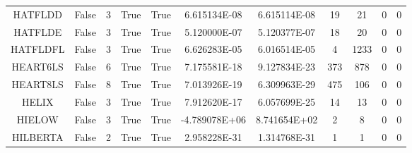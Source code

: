 \begin{longtable}{ccccccccccc}
	\cellcolor{default1} HATFLDD& \cellcolor{default1} False& \cellcolor{default1} 3& \cellcolor{default1} True& \cellcolor{default1} True& \cellcolor{ok} 6.615134E-08& \cellcolor{best} 6.615114E-08& \cellcolor{best} 19& \cellcolor{ok} 21& \cellcolor{default1} 0& \cellcolor{default1} 0\\
	\cellcolor{default2} HATFLDE& \cellcolor{default2} False& \cellcolor{default2} 3& \cellcolor{default2} True& \cellcolor{default2} True& \cellcolor{best} 5.120000E-07& \cellcolor{ok} 5.120377E-07& \cellcolor{best} 18& \cellcolor{ok} 20& \cellcolor{default2} 0& \cellcolor{default2} 0\\
	\cellcolor{default1} HATFLDFL& \cellcolor{default1} False& \cellcolor{default1} 3& \cellcolor{default1} True& \cellcolor{default1} True& \cellcolor{ok} 6.626283E-05& \cellcolor{best} 6.016514E-05& \cellcolor{best} 4& \cellcolor{poor} 1233& \cellcolor{default1} 0& \cellcolor{default1} 0\\
	\cellcolor{default2} HEART6LS& \cellcolor{default2} False& \cellcolor{default2} 6& \cellcolor{default2} True& \cellcolor{default2} True& \cellcolor{ok} 7.175581E-18& \cellcolor{best} 9.127834E-23& \cellcolor{best} 373& \cellcolor{poor} 878& \cellcolor{default2} 0& \cellcolor{default2} 0\\
	\cellcolor{default1} HEART8LS& \cellcolor{default1} False& \cellcolor{default1} 8& \cellcolor{default1} True& \cellcolor{default1} True& \cellcolor{ok} 7.013926E-19& \cellcolor{best} 6.309963E-29& \cellcolor{poor} 475& \cellcolor{best} 106& \cellcolor{default1} 0& \cellcolor{default1} 0\\
	\cellcolor{default2} HELIX& \cellcolor{default2} False& \cellcolor{default2} 3& \cellcolor{default2} True& \cellcolor{default2} True& \cellcolor{ok} 7.912620E-17& \cellcolor{best} 6.057699E-25& \cellcolor{ok} 14& \cellcolor{best} 13& \cellcolor{default2} 0& \cellcolor{default2} 0\\
	\cellcolor{default1} HIELOW& \cellcolor{default1} False& \cellcolor{default1} 3& \cellcolor{default1} True& \cellcolor{default1} True& \cellcolor{best} -4.789078E+06& \cellcolor{poor} 8.741654E+02& \cellcolor{best} 2& \cellcolor{poor} 8& \cellcolor{default1} 0& \cellcolor{default1} 0\\
	\cellcolor{default2} HILBERTA& \cellcolor{default2} False& \cellcolor{default2} 2& \cellcolor{default2} True& \cellcolor{default2} True& \cellcolor{ok} 2.958228E-31& \cellcolor{best} 1.314768E-31& \cellcolor{best} 1& \cellcolor{best} 1& \cellcolor{default2} 0& \cellcolor{default2} 0\\

\end{longtable}
